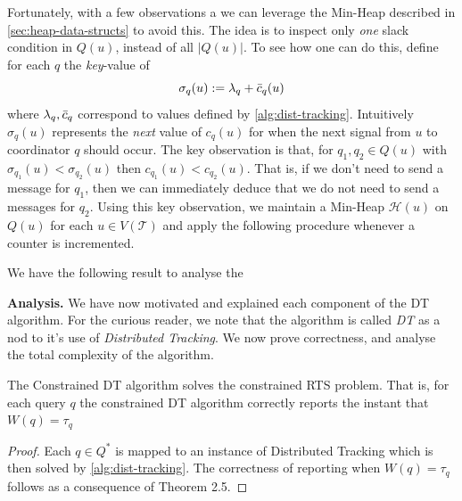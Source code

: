 Fortunately, with a few observations a we can leverage the Min-Heap described in \cref{sec:heap-data-structs} to avoid this. The idea is to inspect only \textit{one} slack condition in $Q(u)$, instead of all $|Q(u)|$. To see how one can do this, define for each $q$ the \textit{key}-value of 
\begin{equation}
    \sigma_q(u) := \lambda_q + \Bar{c}_q(u)
\end{equation}
where $\lambda_q, \Bar{c}_q$ correspond to values defined by \cref{alg:dist-tracking}. Intuitively $\sigma_q(u)$ represents the \textit{next} value of $c_q(u)$ for when the next signal from $u$ to coordinator $q$ should occur. The key observation is that, for $q_1, q_2 \in Q(u)$ with $\sigma_{q_{1}}(u) < \sigma_{q_{2}}(u)$ then $c_{q_1}(u) < c_{q_2}(u)$. That is, if we don't need to send a message for $q_1$, then we can immediately deduce that we do not need to send a messages for $q_2$. Using this key observation, we maintain a Min-Heap $\mathcal{H}(u)$ on $Q(u)$ for each $u\in V(\mathcal{T})$ and apply the following procedure whenever a counter is incremented.

\begin{algorithm}\label{alg:slack-inspection}
\begin{algorithmic}[1]
\State {}
\State {}
\State {}
\Statex {}
\Statex {}
\EndProcedure
\end{algorithmic}
\end{algorithm}

We have the following result to analyse the 


\textbf{Analysis.} We have now motivated and explained each component of the DT algorithm. For the curious reader, we note that the algorithm is called \textit{DT} as a nod to it's use of \textit{Distributed Tracking}. We now prove correctness, and analyse the total complexity of the algorithm.

\begin{theorem}[Correctness] The Constrained DT algorithm solves the constrained RTS problem. That is, for each query $q$ the constrained DT algorithm correctly reports the instant that $W(q) = \tau_q$
\end{theorem}
\begin{proof}
    Each $q \in Q^*$ is mapped to an instance of Distributed Tracking which is then solved by \cref{alg:dist-tracking}. The correctness of reporting when $W(q) = \tau_q$ follows as a consequence of Theorem 2.5.
\end{proof}

